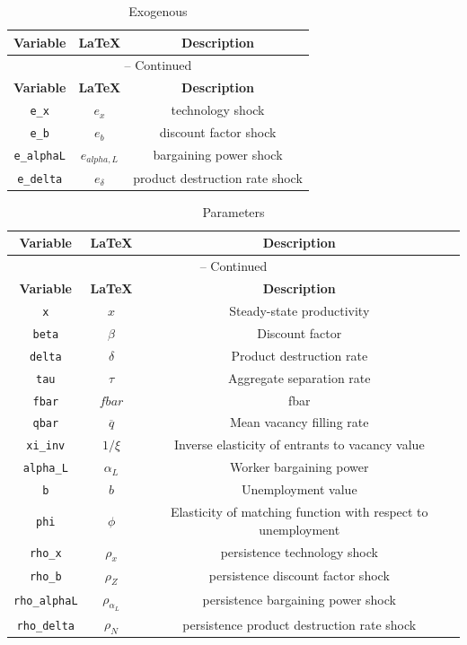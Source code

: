 \begin{center}
\begin{longtable}{ccc}
\caption{Exogenous}\\%
\hline%
\multicolumn{1}{c}{\textbf{Variable}} &
\multicolumn{1}{c}{\textbf{\LaTeX}} &
\multicolumn{1}{c}{\textbf{Description}}\\%
\hline\hline%
\endfirsthead
\multicolumn{3}{c}{{\tablename} \thetable{} -- Continued}\\%
\hline%
\multicolumn{1}{c}{\textbf{Variable}} &
\multicolumn{1}{c}{\textbf{\LaTeX}} &
\multicolumn{1}{c}{\textbf{Description}}\\%
\hline\hline%
\endhead
\texttt{e\_x} & ${e_x}$ & technology shock\\
\texttt{e\_b} & ${e_{b}}$ & discount factor shock\\
\texttt{e\_alphaL} & ${e_{alpha,L}}$ & bargaining power shock\\
\texttt{e\_delta} & ${e_{\delta}}$ & product destruction rate shock\\
\hline%
\end{longtable}
\end{center}
\begin{center}
\begin{longtable}{ccc}
\caption{Parameters}\\%
\hline%
\multicolumn{1}{c}{\textbf{Variable}} &
\multicolumn{1}{c}{\textbf{\LaTeX}} &
\multicolumn{1}{c}{\textbf{Description}}\\%
\hline\hline%
\endfirsthead
\multicolumn{3}{c}{{\tablename} \thetable{} -- Continued}\\%
\hline%
\multicolumn{1}{c}{\textbf{Variable}} &
\multicolumn{1}{c}{\textbf{\LaTeX}} &
\multicolumn{1}{c}{\textbf{Description}}\\%
\hline\hline%
\endhead
\texttt{x} & ${x}$ & Steady-state productivity\\
\texttt{beta} & ${\beta}$ & Discount factor\\
\texttt{delta} & ${\delta}$ & Product destruction rate\\
\texttt{tau} & ${\tau}$ & Aggregate separation rate\\
\texttt{fbar} & $fbar$ & fbar\\
\texttt{qbar} & ${\overline{q}}$ & Mean vacancy filling rate\\
\texttt{xi\_inv} & ${1/\xi}$ & Inverse elasticity of entrants to vacancy value\\
\texttt{alpha\_L} & $\alpha_L$ & Worker bargaining power\\
\texttt{b} & $b$ & Unemployment value\\
\texttt{phi} & $\phi$ & Elasticity of matching function with respect to unemployment\\
\texttt{rho\_x} & ${\rho_x}$ & persistence technology shock\\
\texttt{rho\_b} & ${\rho_Z}$ & persistence discount factor shock\\
\texttt{rho\_alphaL} & ${\rho_{\alpha_L}}$ & persistence bargaining power shock\\
\texttt{rho\_delta} & ${\rho_N}$ & persistence product destruction rate shock\\
\hline%
\end{longtable}
\end{center}
